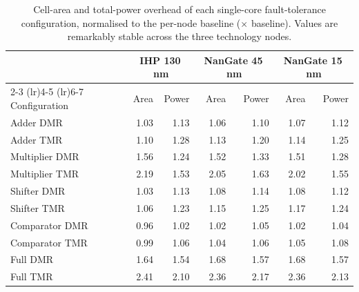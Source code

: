 \begin{table}[htbp]
\centering
\caption{Cell-area and total-power overhead of each single-core fault-tolerance configuration, normalised to the per-node baseline ($\times$ baseline). Values are remarkably stable across the three technology nodes.}
\label{tab:overhead}
\small
\begin{tabular}{lrrrrrr}
\toprule
 & \multicolumn{2}{c}{IHP 130\,nm} & \multicolumn{2}{c}{NanGate 45\,nm} & \multicolumn{2}{c}{NanGate 15\,nm} \\
\cmidrule(lr){2-3} \cmidrule(lr){4-5} \cmidrule(lr){6-7}
Configuration & Area & Power & Area & Power & Area & Power \\
\midrule
Adder DMR & 1.03 & 1.13 & 1.06 & 1.10 & 1.07 & 1.12 \\
Adder TMR & 1.10 & 1.28 & 1.13 & 1.20 & 1.14 & 1.25 \\
Multiplier DMR & 1.56 & 1.24 & 1.52 & 1.33 & 1.51 & 1.28 \\
Multiplier TMR & 2.19 & 1.53 & 2.05 & 1.63 & 2.02 & 1.55 \\
Shifter DMR & 1.03 & 1.13 & 1.08 & 1.14 & 1.08 & 1.12 \\
Shifter TMR & 1.06 & 1.23 & 1.15 & 1.25 & 1.17 & 1.24 \\
Comparator DMR & 0.96 & 1.02 & 1.02 & 1.05 & 1.02 & 1.04 \\
Comparator TMR & 0.99 & 1.06 & 1.04 & 1.06 & 1.05 & 1.08 \\
Full DMR & 1.64 & 1.54 & 1.68 & 1.57 & 1.68 & 1.57 \\
Full TMR & 2.41 & 2.10 & 2.36 & 2.17 & 2.36 & 2.13 \\
\bottomrule
\end{tabular}
\end{table}
